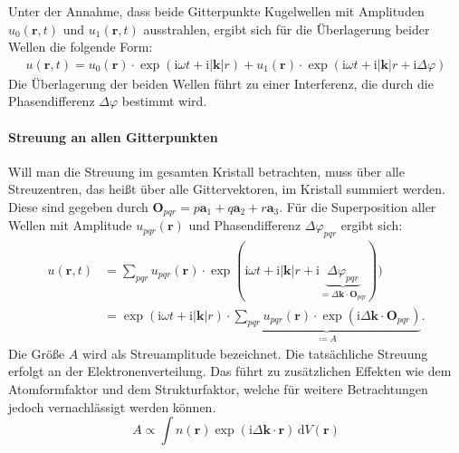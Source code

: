 Unter der Annahme, dass beide Gitterpunkte Kugelwellen mit Amplituden $u_{0}(\mathbf{r}, t)$ und $u_{1}(\mathbf{r}, t)$
ausstrahlen, ergibt sich für die Überlagerung beider Wellen die folgende Form:
\begin{align}
    u(\mathbf{r},t)=u_{0}(\mathbf{r})\cdot \exp(\mathrm{i}\omega t+\mathrm{i}\lvert \mathbf{k}
    \rvert r) + u_{1}(\mathbf{r}) \cdot \exp(\mathrm{i}\omega t + \mathrm{i}\lvert \mathbf{k}
    \rvert r+\mathrm{i}\Delta\varphi)
\end{align}
Die Überlagerung der beiden Wellen führt zu einer Interferenz, die durch die Phasendifferenz $\Delta\varphi$ bestimmt
wird.

\paragraph{Streuung an allen Gitterpunkten}
Will man die Streuung im gesamten Kristall betrachten, muss über alle Streuzentren, das heißt über alle Gittervektoren,
im Kristall summiert werden.
Diese sind gegeben durch $\mathbf{O}_{pqr}=p\mathbf{a}_{1}+q\mathbf{a}_{2}+r\mathbf{a}_{3}$.
Für die Superposition aller Wellen mit Amplitude $u_{pqr}(\mathbf{r})$ und Phasendifferenz $\Delta\varphi_{pqr}$
ergibt sich:
\begin{align}
    u(\mathbf{r}, t)
    &=\sum_{pqr} u_{pqr}(\mathbf{r})\cdot \exp(\mathrm{i}\omega t+\mathrm{i}
    \lvert \mathbf{k} \rvert r+\mathrm{i}\underbrace{ \Delta\varphi_{pqr} }_{ = \Delta
    \mathbf{k}\cdot \mathbf{O}_{pqr}})) \\
    &=\exp(\mathrm{i}\omega t+\mathrm{i}\lvert \mathbf{k} \rvert r)\cdot
    \underbrace{ \sum_{pqr}u_{pqr}(\mathbf{r})\cdot \exp(\mathrm{i}\Delta \mathbf{k}
    \cdot \mathbf{O}_{pqr}) }_{ \coloneqq A }.
    \label{eq:amplitude}
\end{align}
Die Größe $A$ wird als Streuamplitude bezeichnet.
Die tatsächliche Streuung erfolgt an der Elektronenverteilung.
Das führt zu zusätzlichen Effekten wie dem Atomformfaktor und dem Strukturfaktor,
welche für weitere Betrachtungen jedoch vernachlässigt werden können.\autocite[66-69]{Spiess}
\begin{equation*}
    A \propto \int n(\mathbf{r}) \exp(\mathrm{i} \Delta \mathbf{k}\cdot
    \mathbf{r}) \, \mathrm{d}V(\mathbf{r})
\end{equation*}

